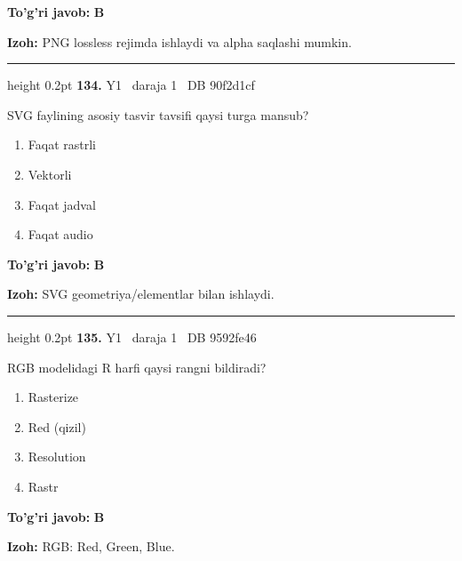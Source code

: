 \documentclass[10pt,a4paper,oneside]{article}
\begin{document}
\begin{tcolorbox}[enhanced,breakable,colback=teal!4,colframe=teal!45!black,boxrule=0.45pt,arc=1.2mm,left=2.8mm,right=2.8mm,top=2mm,bottom=2mm,before skip=2mm,after skip=2mm]
\textbf{\color{teal}To'g'ri javob:} \textbf{B}
\par\smallskip
\textbf{Izoh:} PNG lossless rejimda ishlaydi va alpha saqlashi mumkin.
\end{tcolorbox}
\vspace{2mm}\hrule height 0.2pt \vspace{4mm}
\hypertarget{q134}{\textbf{\color{ink}134.}}  {\color{muted}\scriptsize Y1 \textbullet\ daraja 1 \textbullet\ DB 90f2d1cf}
\par
SVG faylining asosiy tasvir tavsifi qaysi turga mansub?
\begin{enumerate}[label=\Alph*),leftmargin=9mm]
\item Faqat rastrli
\item Vektorli
\item Faqat jadval
\item Faqat audio
\end{enumerate}
\begin{tcolorbox}[enhanced,breakable,colback=teal!4,colframe=teal!45!black,boxrule=0.45pt,arc=1.2mm,left=2.8mm,right=2.8mm,top=2mm,bottom=2mm,before skip=2mm,after skip=2mm]
\textbf{\color{teal}To'g'ri javob:} \textbf{B}
\par\smallskip
\textbf{Izoh:} SVG geometriya/elementlar bilan ishlaydi.
\end{tcolorbox}
\vspace{2mm}\hrule height 0.2pt \vspace{4mm}
\hypertarget{q135}{\textbf{\color{ink}135.}}  {\color{muted}\scriptsize Y1 \textbullet\ daraja 1 \textbullet\ DB 9592fe46}
\par
RGB modelidagi R harfi qaysi rangni bildiradi?
\begin{enumerate}[label=\Alph*),leftmargin=9mm]
\item Rasterize
\item Red (qizil)
\item Resolution
\item Rastr
\end{enumerate}
\begin{tcolorbox}[enhanced,breakable,colback=teal!4,colframe=teal!45!black,boxrule=0.45pt,arc=1.2mm,left=2.8mm,right=2.8mm,top=2mm,bottom=2mm,before skip=2mm,after skip=2mm]
\textbf{\color{teal}To'g'ri javob:} \textbf{B}
\par\smallskip
\textbf{Izoh:} RGB: Red, Green, Blue.
\end{tcolorbox}
\end{document}
